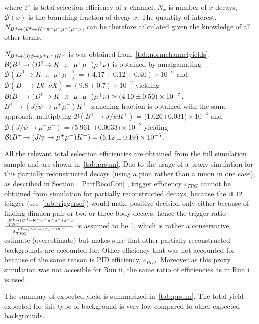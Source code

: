 where $\varepsilon^{x}$ is total selection efficiency of $x$ channel, $N_{x}$ is number of $x$ decays, $\mathcal{B}(x)$ is the branching fraction of decay $x$. The quantity of interest, $N_{{{{B}^+}}\!\rightarrow ({{D}^0}\!\rightarrow {\ensuremath{{K}^+}}{\ensuremath{{\pi}^-}}{\ensuremath{\mu^+\mu^-}}){\mu^+}\nu}$, can be therefore calculated given the knowledge of all other terms. 

$N_{{{{B}^+}}\!\rightarrow ({{J\mskip -3mu/\mskip -2mu\psi\mskip 2mu}}\!\rightarrow {\ensuremath{\mu^+\mu^-}}){{K}^+}}$ is was obtained from~\autoref{tab:normchannelyields}. $\mathcal{B}({{{B}^+}}\!\rightarrow ({{D}^0}\!\rightarrow {\ensuremath{{K}^+}}{\ensuremath{{\pi}^-}}{\ensuremath{\mu^+\mu^-}}){\mu^+}\nu)$ is obtained by amalgamating $\mathcal{B}(D^{0} \rightarrow K^+ \pi^- \mu^+ \mu^{-}) = (4.17\pm0.12\pm0.40)\times 10^{-6}$\cite{Aaij:2015hva} and $\mathcal{B}(B^{+} \rightarrow D l^{+} \nu X) = (9.8 \pm 0.7)\times 10^{-2}$ \cite{Patrignani:2016xqp} yielding $\mathcal{B}({{{B}^+}}\!\rightarrow ({{D}^0}\!\rightarrow {\ensuremath{{K}^+}}{\ensuremath{{\pi}^-}}{\ensuremath{\mu^+\mu^-}}){\mu^+}\nu) \approx (4.10\pm0.50)\times 10 ^{-7 }$. $B^+ \rightarrow (J/\psi \rightarrow \mu^+ \mu^{-}) K^{+}$ branching fraction is obtained with the same approach: multiplying $\mathcal{B}(B^{+} \rightarrow J/\psi K^{+})$ = (1.026$\pm 0.031)\times 10^{-3}$\cite{Patrignani:2016xqp} and $\mathcal{B}(J/\psi \rightarrow \mu^{-} \mu^{+})$ = (5.961 $\pm0.0033) \times 10^{-2}$\cite{Patrignani:2016xqp} yielding $\mathcal{B}({{{B}^+}}\!\rightarrow ({{J\mskip -3mu/\mskip -2mu\psi\mskip 2mu}}\!\rightarrow {\ensuremath{\mu^+\mu^-}}){{K}^+})=(6.12\pm0.19)\times 10^{-5}$.

All the relevant total selection efficiencies are obtained from the full simulation sample and are shown in~\autoref{tab:prsum}. Due to the usage of a proxy simulation for this partially reconstructed decays (using a pion rather than a muon in one case), as described in Section ~\ref{PartRecoCon} , trigger efficiency $\varepsilon_{TRG}$ cannot be obtained from simulation for partially reconstructed decays, because the \texttt{HLT2} trigger (see~\autoref{tab:triggersel}) would make positive decision only either because of finding dimuon pair or two or three-body decays, hence the trigger ratio $\frac{\varepsilon^{{{{B}^+}}\!\rightarrow ({{D}^0}\!\rightarrow {\ensuremath{{K}^+}}{\ensuremath{{\pi}^-}}{\ensuremath{\mu^+\mu^-}}){\mu^+}\nu}_{TRG}}{\varepsilon^{{{{B}^+}}\!\rightarrow ({{J\mskip -3mu/\mskip -2mu\psi\mskip 2mu}}\!\rightarrow {\ensuremath{\mu^+\mu^-}}){{K}^+}}_{TRG}}$ 
is assumed to be 1, which is rather a conservative estimate (overestimate) but makes sure that other partially reconstructed backgrounds are accounted for. Other efficiency that was not accounted for because of the same reason is PID efficiency, $\varepsilon_{PID}$.
Moreover as this proxy simulation was not accesible for Run \Rn{2}, the same ratio of efficiencies as in Run \Rn{1} is used.


The summary of expected yield is summarized in~\autoref{tab:prsum}. The total yield expected for this type of background is very low compared to other expected backgrounds.

